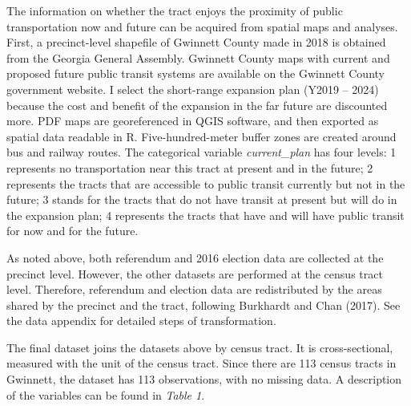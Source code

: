 \documentclass[
]{article}
\begin{document}
The information on whether the tract enjoys the proximity of public
transportation now and future can be acquired from spatial maps and
analyses. First, a precinct-level shapefile of Gwinnett County made in
2018 is obtained from the Georgia General Assembly. Gwinnett County maps
with current and proposed future public transit systems are available on
the Gwinnett County government website. I select the short-range
expansion plan (Y2019 -- 2024) because the cost and benefit of the
expansion in the far future are discounted more. PDF maps are
georeferenced in QGIS software, and then exported as spatial data
readable in R. Five-hundred-meter buffer zones are created around bus
and railway routes. The categorical variable \emph{current\_plan} has
four levels: 1 represents no transportation near this tract at present
and in the future; 2 represents the tracts that are accessible to public
transit currently but not in the future; 3 stands for the tracts that do
not have transit at present but will do in the expansion plan; 4
represents the tracts that have and will have public transit for now and
for the future.

As noted above, both referendum and 2016 election data are collected at
the precinct level. However, the other datasets are performed at the
census tract level. Therefore, referendum and election data are
redistributed by the areas shared by the precinct and the tract,
following Burkhardt and Chan (2017). See the data appendix for detailed
steps of transformation.

The final dataset joins the datasets above by census tract. It is
cross-sectional, measured with the unit of the census tract. Since there
are 113 census tracts in Gwinnett, the dataset has 113 observations,
with no missing data. A description of the variables can be found in
\emph{Table 1}.
\end{document}

